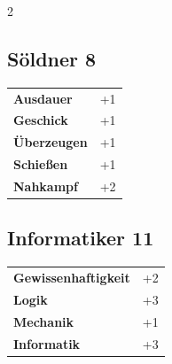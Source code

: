 \begin{multicols}{2}
\begin{tcolorbox}

\end{tcolorbox}

\begin{tcolorbox}
    \subsection*{Söldner \hfill \small{8 }}
    \tcblower




\begin{tabular}{@{}ll@{}}
    \textbf{Ausdauer} & +1\\
    \textbf{Geschick} & +1\\
    \textbf{Überzeugen} & +1\\
    \textbf{Schießen} & +1\\
    \textbf{Nahkampf} & +2\\
\end{tabular}


\end{tcolorbox}

\begin{tcolorbox}
    \subsection*{Informatiker \hfill \small{11 }}
    \tcblower




\begin{tabular}{@{}ll@{}}
    \textbf{Gewissenhaftigkeit} & +2\\
    \textbf{Logik} & +3\\
    \textbf{Mechanik} & +1\\
    \textbf{Informatik} & +3\\
\end{tabular}


\end{tcolorbox}


\end{multicols}
